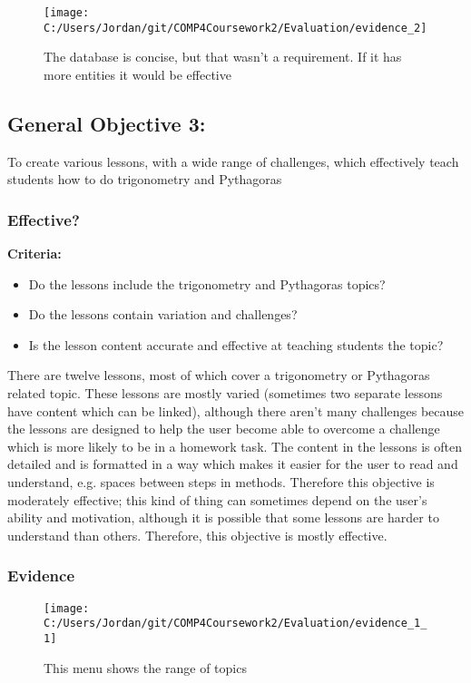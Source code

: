 \begin{figure}[H]
	\texttt{[image: C:/Users/Jordan/git/COMP4Coursework2/Evaluation/evidence\_2]}
	\caption{The database is concise, but that wasn't a requirement. If it has more entities it would be effective}
\end{figure}

\subsection{General Objective 3: }

To create various lessons, with a wide range of challenges, which effectively teach students how to do trigonometry and Pythagoras

\subsubsection{Effective?}

\textbf{Criteria: }

\begin{itemize}
	\item Do the lessons include the trigonometry and Pythagoras topics?
	\item Do the lessons contain variation and challenges?
	\item Is the lesson content accurate and effective at teaching students the topic?
\end{itemize}

There are twelve lessons, most of which cover a trigonometry or Pythagoras related topic. These lessons are mostly varied (sometimes two separate lessons have content which can be linked), although there aren't many challenges because the lessons are designed to help the user become able to overcome a challenge which is more likely to be in a homework task. The content in the lessons is often detailed and is formatted in a way which makes it easier for the user to read and understand, e.g. spaces between steps in methods. Therefore this objective is moderately effective; this kind of thing can sometimes depend on the user's ability and motivation, although it is possible that some lessons are harder to understand than others. Therefore, this objective is mostly effective.

\subsubsection{Evidence}

\begin{figure}[H]
	\texttt{[image: C:/Users/Jordan/git/COMP4Coursework2/Evaluation/evidence\_1\_1]}
	\caption{This menu shows the range of topics}
\end{figure}

